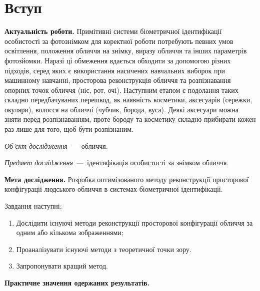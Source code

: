 \chapter*{Вступ}

\textbf{Актуальність роботи.}
Примітивні системи біометричної ідентифікації особистості за фотознімком
для коректної роботи потребують певних умов
освітлення, положення обличчя на знімку, виразу обличчя
та інших параметрів фотозйомки.
Наразі ці обмеження вдається обходити за допомогою різних підходів,
серед яких є
використання насичених навчальних виборок при машинному навчанні,
просторова реконструкція обличчя та
розпізнавання опорних точок обличчя (ніс, рот, очі).
Наступним етапом є подолання таких складно передбачуваних перешкод,
як наявність косметики, аксесуарів (сережки, окуляри),
волосся на обличчі (чубчик, борода, вуса).
Деякі аксесуари можна зняти перед розпізнаванням,
проте бороду та косметику складно прибирати кожен раз лише для того,
щоб бути розпізнаним.

\textit{Об’єкт дослідження}~---~обличчя.

\textit{Предмет дослідження}~---~ідентифікація особистості за знімком обличчя.

\textbf{Мета дослідження.}
Розробка оптимізованого методу реконструкції просторової конфігурації
людського обличчя в системах біометричної ідентифікації.

Завдання наступні:
\begin{enumerate}
  \item
    Дослідити існуючі методи реконструкції просторової конфігурації обличчя
    за одним або кількома зображеннями;
  \item
    Проаналізувати існуючі методи з теоретичної точки зору.
  \item
    Запропонувати кращий метод.
\end{enumerate}

\textbf{Практичне значення одержаних результатів.}
